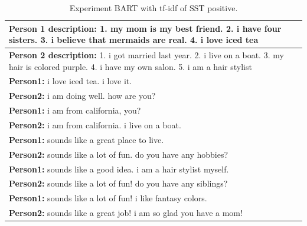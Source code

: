 \begin{table}[ht]
\centering
 \begin{tabular}{|p{14cm}|} 
 \hline\hline
 \textbf{Person 1 description:} 1. my mom is my best friend. 2. i have four sisters. 3. i believe that mermaids are real. 4. i love iced tea \\
 \hline
 \textbf{Person 2 description:} 1. i got married last year. 2. i live on a boat. 3. my hair is colored purple. 4. i have my own salon. 5. i am a hair stylist \\
 \hline\hline
 \textbf{Person1:} i love iced tea. i love it. \\
 \textbf{Person2:} i am doing well. how are you? \\ 
 \textbf{Person1:} i am from california, you? \\
 \textbf{Person2:} i am from california. i live on a boat.\\
 \textbf{Person1:} sounds like a great place to live. \\
 \textbf{Person2:} sounds like a lot of fun. do you have any hobbies? \\
 \textbf{Person1:} sounds like a good idea. i am a hair stylist myself. \\
 \textbf{Person2:} sounds like a lot of fun! do you have any siblings? \\
 \textbf{Person1:} sounds like a lot of fun! i like fantasy colors. \\
 \textbf{Person2:} sounds like a great job! i am so glad you have a mom! \\
 \hline\hline
 \end{tabular}
 \caption{Experiment BART with tf-idf of SST positive.}
\label{tab:bart_tfidf_sst_pos_ap}
\end{table}

